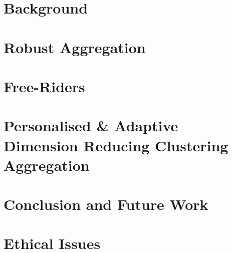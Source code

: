 \documentclass[12pt,twoside]{report}
\begin{document}
\chapter{Background}


\chapter{Robust Aggregation}


\chapter{Free-Riders}


\chapter[FedPADRC]{Personalised \& Adaptive Dimension Reducing Clustering Aggregation}
\label{chap:fedpadrc}


\chapter{Conclusion and Future Work}


\chapter{Ethical Issues}





\begin{appendices}

\end{appendices}
\end{document}
